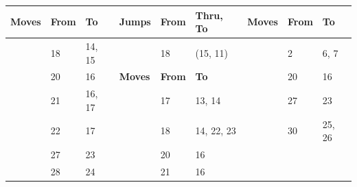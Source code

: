 \documentclass{article}
\begin{document}
\begin{table}[]
\begin{tabular}{|lllllllll|}
\multicolumn{1}{|l|}{\textbf{Moves}}           & \multicolumn{1}{l|}{\textbf{From}} & \multicolumn{1}{l|}{\textbf{To}} & \multicolumn{1}{l|}{\textbf{Jumps}}           & \multicolumn{1}{l|}{\textbf{From}} & \multicolumn{1}{l|}{\textbf{Thru, To}} & \multicolumn{1}{l|}{\textbf{Moves}}           & \multicolumn{1}{l|}{\textbf{From}} & \textbf{To}              \\ \hline
\multicolumn{1}{|l|}{\cellcolor[HTML]{C0C0C0}} & \multicolumn{1}{l|}{18}            & \multicolumn{1}{l|}{14, 15}      & \multicolumn{1}{l|}{\cellcolor[HTML]{C0C0C0}} & \multicolumn{1}{l|}{18}            & \multicolumn{1}{l|}{(15, 11)}          & \multicolumn{1}{l|}{\cellcolor[HTML]{C0C0C0}} & \multicolumn{1}{l|}{2}             & 6, 7                     \\ \cline{4-6}
\multicolumn{1}{|l|}{\cellcolor[HTML]{C0C0C0}} & \multicolumn{1}{l|}{20}            & \multicolumn{1}{l|}{16}          & \multicolumn{1}{l|}{\textbf{Moves}}           & \multicolumn{1}{l|}{\textbf{From}} & \multicolumn{1}{l|}{\textbf{To}}       & \multicolumn{1}{l|}{\cellcolor[HTML]{C0C0C0}} & \multicolumn{1}{l|}{20}            & 16                       \\ \cline{4-6}
\multicolumn{1}{|l|}{\cellcolor[HTML]{C0C0C0}} & \multicolumn{1}{l|}{21}            & \multicolumn{1}{l|}{16, 17}      & \multicolumn{1}{l|}{\cellcolor[HTML]{C0C0C0}} & 17                                 & \multicolumn{1}{l|}{13, 14}            & \multicolumn{1}{l|}{\cellcolor[HTML]{C0C0C0}} & \multicolumn{1}{l|}{27}            & 23                       \\
\multicolumn{1}{|l|}{\cellcolor[HTML]{C0C0C0}} & \multicolumn{1}{l|}{22}            & \multicolumn{1}{l|}{17}          & \multicolumn{1}{l|}{\cellcolor[HTML]{C0C0C0}} & 18                                 & \multicolumn{1}{l|}{14, 22, 23}        & \multicolumn{1}{l|}{\cellcolor[HTML]{C0C0C0}} & \multicolumn{1}{l|}{30}            & 25, 26                   \\ \cline{8-9}
\multicolumn{1}{|l|}{\cellcolor[HTML]{C0C0C0}} & \multicolumn{1}{l|}{27}            & \multicolumn{1}{l|}{23}          & \multicolumn{1}{l|}{\cellcolor[HTML]{C0C0C0}} & 20                                 & \multicolumn{1}{l|}{16}                & \cellcolor[HTML]{C0C0C0}                      & \cellcolor[HTML]{C0C0C0}           & \cellcolor[HTML]{C0C0C0} \\
\multicolumn{1}{|l|}{\cellcolor[HTML]{C0C0C0}} & \multicolumn{1}{l|}{28}            & \multicolumn{1}{l|}{24}          & \multicolumn{1}{l|}{\cellcolor[HTML]{C0C0C0}} & 21                                 & \multicolumn{1}{l|}{16}                & \cellcolor[HTML]{C0C0C0}                      & \cellcolor[HTML]{C0C0C0}           & \cellcolor[HTML]{C0C0C0} \\

\end{tabular}
\end{table}
\end{document}
